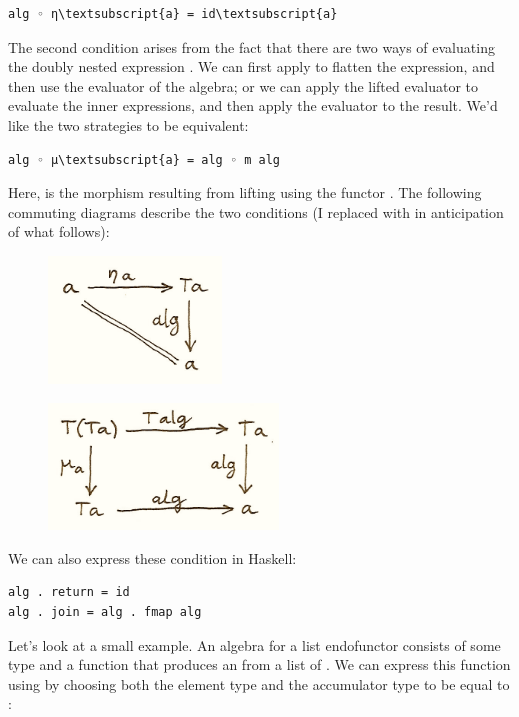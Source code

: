 \begin{Verbatim}[commandchars=\\\{\}]
alg ◦ η\textsubscript{a} = id\textsubscript{a}
\end{Verbatim}
The second condition arises from the fact that there are two ways of
evaluating the doubly nested expression . We can first
apply  to flatten the expression, and then use the evaluator
of the algebra; or we can apply the lifted evaluator to evaluate the
inner expressions, and then apply the evaluator to the result. We'd like
the two strategies to be equivalent:

\begin{Verbatim}[commandchars=\\\{\}]
alg ◦ μ\textsubscript{a} = alg ◦ m alg
\end{Verbatim}
Here,  is the morphism resulting from lifting
 using the functor . The following commuting
diagrams describe the two conditions (I replaced  with
 in anticipation of what follows):

\begin{figure}[H]
\centering
\includegraphics[width=1.81250in]{images/talg1.png}
\end{figure}

\begin{figure}[H]
\centering
\includegraphics[width=2.40625in]{images/talg2.png}
\end{figure}

\noindent
We can also express these condition in Haskell:

\begin{Verbatim}[commandchars=\\\{\}]
alg . return = id
alg . join = alg . fmap alg
\end{Verbatim}
Let's look at a small example. An algebra for a list endofunctor
consists of some type  and a function that produces an
 from a list of . We can express this function using
 by choosing both the element type and the accumulator
type to be equal to :

